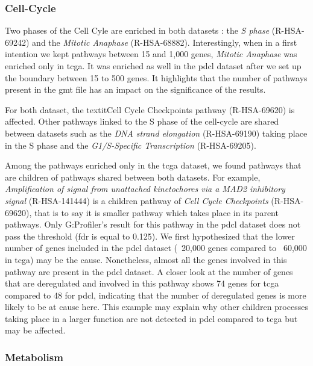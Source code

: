\subsubsection{Cell-Cycle}

Two phases of the Cell Cyle are enriched in both datasets : the \textit{S phase} (R-HSA-69242) and the \textit{Mitotic Anaphase} (R-HSA-68882).
Interestingly, when in a first intention we kept pathways between 15 and 1,000 genes, \textit{Mitotic Anaphase}  was enriched only in \acrshort{tcga}.
It was enriched as well in the \acrshort{pdcl} dataset after we set up the boundary between 15 to 500 genes.
It highlights that the number of pathways present in the \acrshort{gmt} file has an impact on the significance of the results.

For both dataset, the textit{Cell Cycle Checkpoints} pathway (R-HSA-69620) is affected.
Other pathways linked to the S phase of the cell-cycle are shared between datasets such as the \textit{DNA strand elongation} (R-HSA-69190) taking place in the S phase and the \textit{G1/S-Specific Transcription} (R-HSA-69205).

Among the pathways enriched only in the \acrshort{tcga} dataset, we found pathways that are children of pathways shared between both datasets.
For example, \textit{Amplification of signal from unattached kinetochores via a MAD2 inhibitory signal} (R-HSA-141444) is a children pathway of \textit{Cell Cycle Checkpoints} (R-HSA-69620), that is to say it is smaller pathway which takes place in its parent pathways.
Only G:Profiler's result for this pathway in the \acrshort{pdcl} dataset does not pass the threshold (\acrshort{fdr} is equal to 0.125).
We first hypothesized that the lower number of genes included in the \acrshort{pdcl} dataset (~20,000 genes compared to ~60,000 in \acrshort{tcga}) may be the cause.
Nonetheless, almost all the genes involved in this pathway are present in the \acrshort{pdcl} dataset.
A closer look at the number of genes that are deregulated and involved in this pathway shows 74 genes for \acrshort{tcga} compared to 48 for \acrshort{pdcl}, indicating that the number of deregulated genes is more likely to be at cause here.
This example may explain why other children processes taking place in a larger function are not detected in \acrshort{pdcl} compared to \acrshort{tcga} but may be affected.

\subsubsection{Metabolism}

